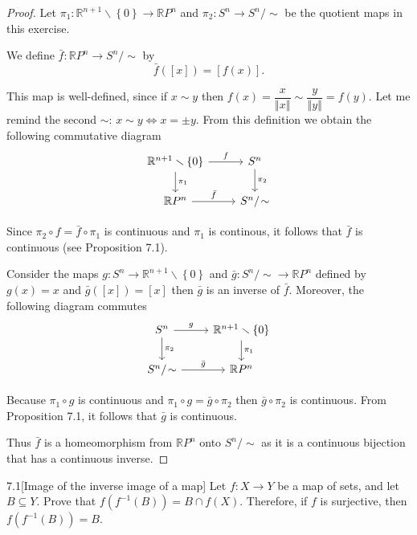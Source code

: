 \begin{proof}
	Let \( \pi_{1}: \mathbb{R}^{n+1}\smallsetminus \left\{0\right\} \to \mathbb{R}P^{n} \) and \( \pi_{2}: S^{n} \to S^{n}/\!\sim \) be the quotient maps in this exercise.

	We define \( \bar{f}: \mathbb{R}P^{n} \to S^{n}/\!\sim \) by
	\[
		\bar{f}([x]) = [f(x)].
	\]

	This map is well-defined, since if \( x \sim y \) then \( f(x) = \dfrac{x}{\left\Vert x\right\Vert} \sim \dfrac{y}{\left\Vert y\right\Vert} = f(y) \). Let me remind the second \( \sim \): \( x \sim y \Longleftrightarrow x = \pm y \). From this definition we obtain the following commutative diagram
	\[
		\begin{tikzcd}
			\mathbb{R}^{n+1}\smallsetminus \left\{0\right\} \arrow{r}{f} \arrow{d}{\pi_{1}} & S^{n} \arrow{d}{\pi_{2}} \\
			\mathbb{R}P^{n} \arrow{r}{\bar{f}}                                & S^{n}/\!\sim
		\end{tikzcd}
	\]

	Since \( \pi_{2} \circ f = \bar{f} \circ \pi_{1} \) is continuous and \( \pi_{1} \) is continous, it follows that \( \bar{f} \) is continuous (see Proposition 7.1).

	Consider the maps \( g: S^{n} \to \mathbb{R}^{n+1}\smallsetminus\left\{0\right\} \) and \( \bar{g}: S^{n}/\!\sim \to \mathbb{R}P^{n} \) defined by \( g(x) = x \) and \( \bar{g}([x]) = [x] \) then \( \bar{g} \) is an inverse of \( \bar{f} \). Moreover, the following diagram commutes
	\[
		\begin{tikzcd}
			S^{n} \arrow{r}{g} \arrow{d}{\pi_{2}} & \mathbb{R}^{n+1}\smallsetminus\left\{0\right\} \arrow{d}{\pi_{1}} \\
			S^{n}/\!\sim \arrow{r}{\bar{g}}         & \mathbb{R}P^{n}
		\end{tikzcd}
	\]

	Because \( \pi_{1} \circ g \) is continuous and \( \pi_{1} \circ g = \bar{g} \circ \pi_{2} \) then \( \bar{g} \circ \pi_{2} \) is continuous. From Proposition 7.1, it follows that \( \bar{g} \) is continuous.

	Thus \( \bar{f} \) is a homeomorphism from \( \mathbb{R}P^{n} \) onto \( S^{n}/\!\sim \) as it is a continuous bijection that has a continuous inverse.
\end{proof}

\begin{problem}{7.1}[Image of the inverse image of a map]
Let \( f: X \to Y \) be a map of sets, and let \( B \subseteq Y \). Prove that \( f(f^{-1}(B)) = B \cap f(X) \). Therefore, if \( f \) is surjective, then \( f(f^{-1}(B)) = B \).
\end{problem}

